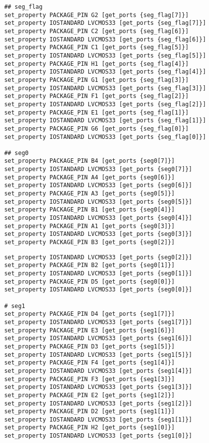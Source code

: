 {\begin{spacing}{1.5}
\begin{lstlisting}
	## seg_flag
	set_property PACKAGE_PIN G2 [get_ports {seg_flag[7]}]
	set_property IOSTANDARD LVCMOS33 [get_ports {seg_flag[7]}]
	set_property PACKAGE_PIN C2 [get_ports {seg_flag[6]}]
	set_property IOSTANDARD LVCMOS33 [get_ports {seg_flag[6]}]
	set_property PACKAGE_PIN C1 [get_ports {seg_flag[5]}]
	set_property IOSTANDARD LVCMOS33 [get_ports {seg_flag[5]}]
	set_property PACKAGE_PIN H1 [get_ports {seg_flag[4]}]
	set_property IOSTANDARD LVCMOS33 [get_ports {seg_flag[4]}]
	set_property PACKAGE_PIN G1 [get_ports {seg_flag[3]}]
	set_property IOSTANDARD LVCMOS33 [get_ports {seg_flag[3]}]
	set_property PACKAGE_PIN F1 [get_ports {seg_flag[2]}]
	set_property IOSTANDARD LVCMOS33 [get_ports {seg_flag[2]}]
	set_property PACKAGE_PIN E1 [get_ports {seg_flag[1]}]
	set_property IOSTANDARD LVCMOS33 [get_ports {seg_flag[1]}]
	set_property PACKAGE_PIN G6 [get_ports {seg_flag[0]}]
	set_property IOSTANDARD LVCMOS33 [get_ports {seg_flag[0]}]
	
	## seg0
	set_property PACKAGE_PIN B4 [get_ports {seg0[7]}]
	set_property IOSTANDARD LVCMOS33 [get_ports {seg0[7]}]
	set_property PACKAGE_PIN A4 [get_ports {seg0[6]}]
	set_property IOSTANDARD LVCMOS33 [get_ports {seg0[6]}]
	set_property PACKAGE_PIN A3 [get_ports {seg0[5]}]
	set_property IOSTANDARD LVCMOS33 [get_ports {seg0[5]}]
	set_property PACKAGE_PIN B1 [get_ports {seg0[4]}]
	set_property IOSTANDARD LVCMOS33 [get_ports {seg0[4]}]
	set_property PACKAGE_PIN A1 [get_ports {seg0[3]}]
	set_property IOSTANDARD LVCMOS33 [get_ports {seg0[3]}]
	set_property PACKAGE_PIN B3 [get_ports {seg0[2]}]
	\end{lstlisting}
	\begin{lstlisting}
	set_property IOSTANDARD LVCMOS33 [get_ports {seg0[2]}]
	set_property PACKAGE_PIN B2 [get_ports {seg0[1]}]
	set_property IOSTANDARD LVCMOS33 [get_ports {seg0[1]}]
	set_property PACKAGE_PIN D5 [get_ports {seg0[0]}]
	set_property IOSTANDARD LVCMOS33 [get_ports {seg0[0]}]
	
	# seg1
	set_property PACKAGE_PIN D4 [get_ports {seg1[7]}]
	set_property IOSTANDARD LVCMOS33 [get_ports {seg1[7]}]
	set_property PACKAGE_PIN E3 [get_ports {seg1[6]}]
	set_property IOSTANDARD LVCMOS33 [get_ports {seg1[6]}]
	set_property PACKAGE_PIN D3 [get_ports {seg1[5]}]
	set_property IOSTANDARD LVCMOS33 [get_ports {seg1[5]}]
	set_property PACKAGE_PIN F4 [get_ports {seg1[4]}]
	set_property IOSTANDARD LVCMOS33 [get_ports {seg1[4]}]
	set_property PACKAGE_PIN F3 [get_ports {seg1[3]}]
	set_property IOSTANDARD LVCMOS33 [get_ports {seg1[3]}]
	set_property PACKAGE_PIN E2 [get_ports {seg1[2]}]
	set_property IOSTANDARD LVCMOS33 [get_ports {seg1[2]}]
	set_property PACKAGE_PIN D2 [get_ports {seg1[1]}]
	set_property IOSTANDARD LVCMOS33 [get_ports {seg1[1]}]
	set_property PACKAGE_PIN H2 [get_ports {seg1[0]}]
	set_property IOSTANDARD LVCMOS33 [get_ports {seg1[0]}]
	

\end{lstlisting}
\end{spacing}}
